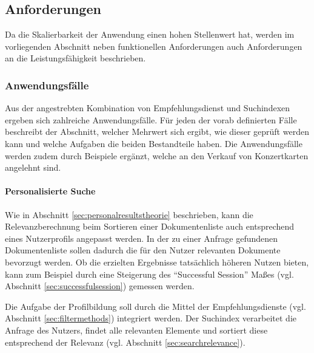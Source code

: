 \subsection{Anforderungen}\label{sec:requirements}

Da die Skalierbarkeit der Anwendung einen hohen Stellenwert hat, werden im vorliegenden Abschnitt neben funktionellen Anforderungen auch Anforderungen an die Leistungsfähigkeit beschrieben.


\subsubsection{Anwendungsfälle}\label{sec:userstories}

Aus der angestrebten Kombination von Empfehlungsdienst und Suchindexen ergeben sich zahlreiche Anwendungsfälle. Für jeden der vorab definierten Fälle beschreibt der Abschnitt, welcher Mehrwert sich ergibt, wie dieser geprüft werden kann und welche Aufgaben die beiden Bestandteile haben. Die Anwendungsfälle werden zudem durch Beispiele ergänzt, welche an den Verkauf von Konzertkarten angelehnt sind.%

\paragraph{Personalisierte Suche} Wie in Abschnitt \ref{sec:personalresultstheorie} beschrieben, kann die Relevanzberechnung beim Sortieren einer Dokumentenliste auch entsprechend eines Nutzerprofils angepasst werden. In der zu einer Anfrage gefundenen Dokumentenliste sollen dadurch die für den Nutzer relevanten Dokumente bevorzugt werden. Ob die erzielten Ergebnisse tatsächlich höheren Nutzen bieten, kann zum Beispiel durch eine Steigerung des ``Successful Session'' Maßes (vgl. Abschnitt \ref{sec:successfulsession}) gemessen werden.

Die Aufgabe der Profilbildung soll durch die Mittel der Empfehlungsdienste (vgl. Abschnitt \ref{sec:filtermethods}) integriert werden. Der Suchindex verarbeitet die Anfrage des Nutzers, findet alle relevanten Elemente und sortiert diese entsprechend der Relevanz (vgl. Abschnitt \ref{sec:searchrelevance}).

